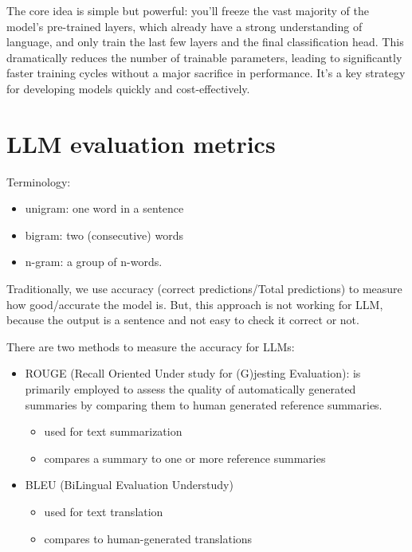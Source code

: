 \documentclass[12pt]{report}
\begin{document}
The core idea is simple but powerful: you'll freeze the vast majority of the model's pre-trained layers, which already have a strong understanding of language, and only train the last few layers and the final classification head. This dramatically reduces the number of trainable parameters, leading to significantly faster training cycles without a major sacrifice in performance. It's a key strategy for developing models quickly and cost-effectively.





\section{LLM evaluation metrics}


Terminology:
\begin{itemize}
  \item unigram: one word in a sentence
  \item bigram: two (consecutive) words
  \item n-gram: a group of n-words.
\end{itemize}


Traditionally, we use accuracy (correct predictions/Total predictions) to measure how good/accurate the model is. But, this approach is not working for LLM, because the output is a sentence and not easy to check it correct or not.

There are two methods to measure the accuracy for LLMs:
\begin{itemize}
  \item ROUGE (Recall Oriented Under study for (G)jesting Evaluation): is primarily employed to assess the quality of automatically generated summaries by comparing them to human generated reference summaries.
  \begin{itemize}
    \item used for text summarization
    \item compares a summary to one or more reference summaries
  \end{itemize}
  \item BLEU (BiLingual Evaluation Understudy)
  \begin{itemize}
    \item used for text translation
    \item compares to human-generated translations
  \end{itemize}
\end{itemize}
\end{document}
